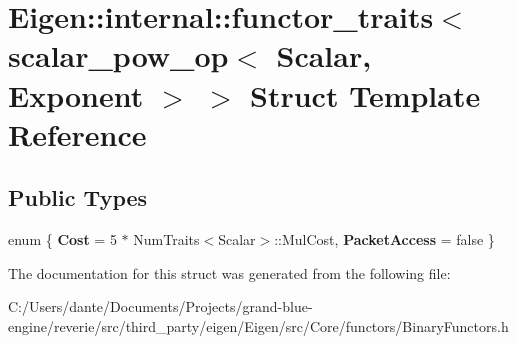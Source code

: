 \hypertarget{struct_eigen_1_1internal_1_1functor__traits_3_01scalar__pow__op_3_01_scalar_00_01_exponent_01_4_01_4}{}\section{Eigen\+::internal\+::functor\+\_\+traits$<$ scalar\+\_\+pow\+\_\+op$<$ Scalar, Exponent $>$ $>$ Struct Template Reference}
\label{struct_eigen_1_1internal_1_1functor__traits_3_01scalar__pow__op_3_01_scalar_00_01_exponent_01_4_01_4}
\subsection*{Public Types}
\begin{DoxyCompactItemize}
\item 
\mbox{\label{struct_eigen_1_1internal_1_1functor__traits_3_01scalar__pow__op_3_01_scalar_00_01_exponent_01_4_01_4_a02fbcdd3f9644539747a8aa0e90259db}} 
enum \{ {\bfseries Cost} = 5 $\ast$ Num\+Traits$<$Scalar$>$\+::Mul\+Cost, 
{\bfseries Packet\+Access} = false
 \}
\end{DoxyCompactItemize}


The documentation for this struct was generated from the following file\+:\begin{DoxyCompactItemize}
\item 
C\+:/\+Users/dante/\+Documents/\+Projects/grand-\/blue-\/engine/reverie/src/third\+\_\+party/eigen/\+Eigen/src/\+Core/functors/Binary\+Functors.\+h\end{DoxyCompactItemize}
